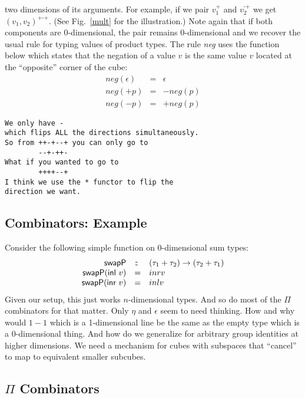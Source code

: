 \documentclass[authoryear,preprint]{sigplanconf}
\newcommand{\mm}{\texttt{-}}
\newcommand{\pp}{\texttt{+}}
\newcommand{\negp}[1]{\textit{neg}(#1)}
\newcommand{\inl}[1]{\textsf{inl}~#1}
\newcommand{\inr}[1]{\textsf{inr}~#1}
\newcommand{\hast}{:\mkern -2.5mu:\;}
\begin{document}
two dimensions of its arguments. For example, if we pair $v_1^{\pp}$ and
$v_2^{\mm\pp}$ we get $(v_1,v_2)^{\pp\mm\pp}$. (See Fig.~\ref{mult} for the
illustration.) Note again that if both components are 0-dimensional, the pair
remains 0-dimensional and we recover the usual rule for typing values of
product types. The rule \textit{neg} uses the function below which states
that the negation of a value $v$ is the same value $v$ located at the
``opposite'' corner of the cube:
\[\begin{array}{rcl}
\negp{\epsilon} &=& \epsilon \\
\negp{+p} &=& -\negp{p} \\
\negp{-p} &=& +\negp{p}
\end{array}\]

\begin{verbatim}
We only have -
which flips ALL the directions simultaneously.
So from ++-+--+ you can only go to
        --+-++-
What if you wanted to go to
        ++++--+
I think we use the * functor to flip the 
direction we want. 
\end{verbatim}

\subsection{Combinators: Example} 

Consider the following simple function on 0-dimensional sum types:
\[\begin{array}{rcl}
\textsf{swapP} &\hast& (\tau_1 + \tau_2) \rightarrow (\tau_2 + \tau_1) \\
\textsf{swapP} (\inl{v}) &=& inr{v} \\
\textsf{swapP} (\inr{v}) &=& inl{v}
\end{array}\]
Given our setup, this just works $n$-dimensional types. And so do most of the
$\Pi$ combinators for that matter. Only $\eta$ and $\epsilon$ seem to need
thinking. How and why would $1-1$ which is a 1-dimensional line be the same
as the empty type which is a 0-dimensional thing. And how do we generalize
for arbitrary group identities at higher dimensions. We need a mechanism for
cubes with subspaces that ``cancel'' to map to equivalent smaller subcubes.

\subsection{$\Pi$ Combinators} 
\end{document}
